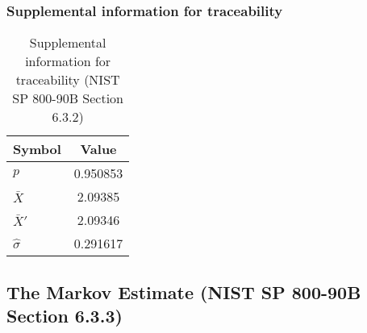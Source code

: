 \documentclass[a3paper,xelatex,english]{bxjsarticle}
\begin{document}
\subsubsection{Supplemental information for traceability}
\renewcommand{\arraystretch}{1.8}
\begin{table}[h]
\caption{Supplemental information for traceability (NIST SP 800-90B Section 6.3.2)}
\begin{center}
\begin{tabular}{|l|c|}
\hline 
\rowcolor{anotherlightblue} %
Symbol				& Value \\ \hline 
$p$				& 0.950853\\ \hline 
$\bar{X}$ 		&  2.09385\\ \hline
$\bar{X}'$		&  2.09346\\ \hline
$\hat{\sigma}$		& 0.291617\\ \hline
\end{tabular}
\end{center}
\end{table}
\renewcommand{\arraystretch}{1.4}
\clearpage
\subsection{The Markov Estimate (NIST SP 800-90B Section 6.3.3)}\label{sec:Binary633}
\end{document}
